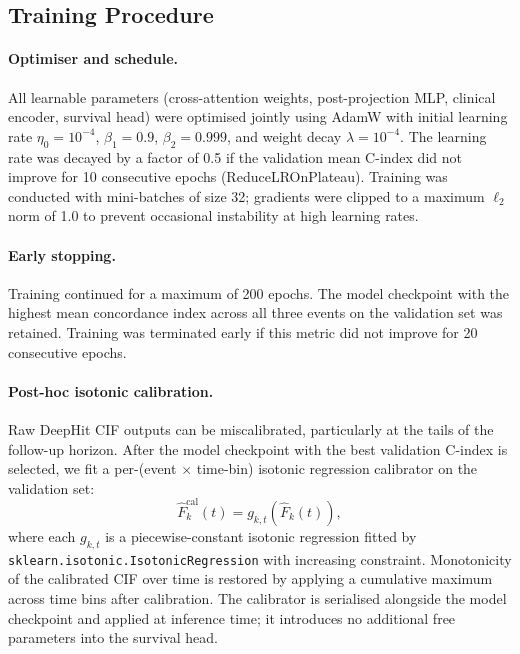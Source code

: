 \documentclass[11pt,a4paper]{article}
\begin{document}
\subsection{Training Procedure}
\label{sec:training}

\paragraph{Optimiser and schedule.}
All learnable parameters (cross-attention weights, post-projection MLP,
clinical encoder, survival head) were optimised jointly
using AdamW \citep{loshchilov2019adamw} with initial learning rate
$\eta_0 = 10^{-4}$, $\beta_1 = 0.9$, $\beta_2 = 0.999$, and weight decay
$\lambda = 10^{-4}$.  The learning rate was decayed by a factor of 0.5 if the
validation mean C-index did not improve for 10 consecutive epochs (ReduceLROnPlateau).
Training was conducted with mini-batches of size 32; gradients were clipped to
a maximum $\ell_2$ norm of 1.0 to prevent occasional instability at high
learning rates.

\paragraph{Early stopping.}
Training continued for a maximum of 200 epochs.  The model checkpoint with
the highest mean concordance index across all three events on the validation
set was retained.  Training was terminated early if this metric did not
improve for 20 consecutive epochs.

\paragraph{Post-hoc isotonic calibration.}
Raw DeepHit CIF outputs can be miscalibrated, particularly at the tails of the
follow-up horizon.  After the model checkpoint with the best validation
C-index is selected, we fit a per-(event $\times$ time-bin) isotonic
regression calibrator on the validation set:
\begin{equation}
  \hat{F}^{\mathrm{cal}}_k(t) = g_{k,t}(\hat{F}_k(t)),
\end{equation}
where each $g_{k,t}$ is a piecewise-constant isotonic regression
\citep{barlow1972isotonic} fitted by \texttt{sklearn.isotonic.\allowbreak IsotonicRegression}
with increasing constraint.  Monotonicity of the calibrated CIF over time is
restored by applying a cumulative maximum across time bins after calibration.
The calibrator is serialised alongside the model checkpoint and applied at
inference time; it introduces no additional free parameters into the survival
head.
\end{document}
